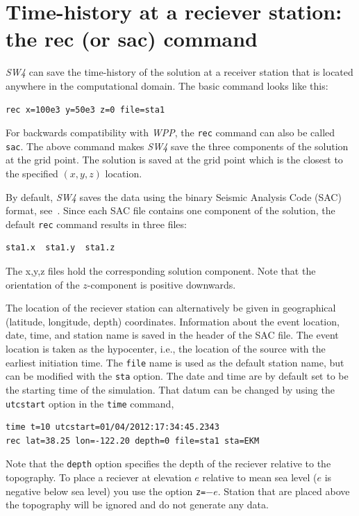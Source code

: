\documentclass[11pt]{report}
\begin{document}
\section{Time-history at a reciever station: the rec (or sac) command}\label{sec:rec}

\emph{SW4} can save the time-history of the solution at a receiver station that is located anywhere
in the computational domain. The basic command looks like this:
\begin{verbatim}
rec x=100e3 y=50e3 z=0 file=sta1
\end{verbatim}
For backwards compatibility with \emph{WPP}, the \verb+rec+ command can also be called \verb+sac+.
The above command makes \emph{SW4} save the three components of the solution at the grid point. The
solution is saved at the grid point which is the closest to the specified $(x,y,z)$ location. 

By default, \emph{SW4} saves the data using the binary Seismic Analysis Code (SAC) format,
see~\cite{Goldstein-et-al}. Since each SAC file contains one component of the solution, the default
\verb+rec+ command results in three files:
\begin{verbatim}
sta1.x  sta1.y  sta1.z
\end{verbatim}
The x,y,z files hold the corresponding solution component. Note that the orientation of the
$z$-component is positive downwards.

The location of the reciever station can alternatively be given in geographical (latitude,
longitude, depth) coordinates. Information about the event location, date, time, and station name is
saved in the header of the SAC file. The event location is taken as the hypocenter, i.e., the
location of the source with the earliest initiation time. The \verb+file+ name is used as the
default station name, but can be modified with the \verb+sta+ option. The date and time are by
default set to be the starting time of the simulation. That datum can be changed by using the
\verb+utcstart+ option in the \verb+time+ command,
%
\begin{verbatim}
time t=10 utcstart=01/04/2012:17:34:45.2343
rec lat=38.25 lon=-122.20 depth=0 file=sta1 sta=EKM
\end{verbatim}
Note that the \verb+depth+ option specifies the depth of the reciever relative to the topography. To
place a reciever at elevation $e$ relative to mean sea level ($e$ is negative below sea level) you
use the option {\tt z=}$-e$. Station that are placed above the topography will be ignored and do not
generate any data.
\end{document}
